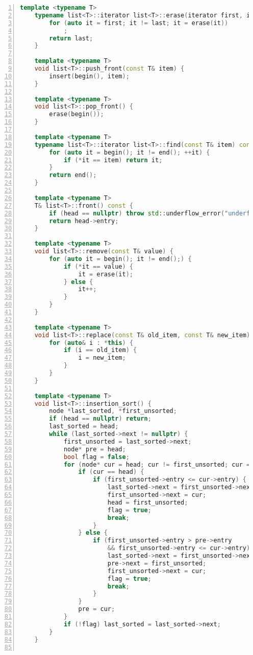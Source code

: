 \documentclass{article}
\begin{document}
\begin{lstlisting}[xleftmargin = 2em,xrightmargin = 2em, aboveskip = 0.5em, numbers = left, language = C++]
    template <typename T>
    typename list<T>::iterator list<T>::erase(iterator first, iterator last) {
        for (auto it = first; it != last; it = erase(it))
            ;
        return last;
    }

    template <typename T>
    void list<T>::push_front(const T& item) {
        insert(begin(), item);
    }

    template <typename T>
    void list<T>::pop_front() {
        erase(begin());
    }

    template <typename T>
    typename list<T>::iterator list<T>::find(const T& item) const {
        for (auto it = begin(); it != end(); ++it) {
            if (*it == item) return it;
        }
        return end();
    }

    template <typename T>
    T& list<T>::front() const {
        if (head == nullptr) throw std::underflow_error("underflow");
        return head->entry;
    }

    template <typename T>
    void list<T>::remove(const T& value) {
        for (auto it = begin(); it != end();) {
            if (*it == value) {
                it = erase(it);
            } else {
                it++;
            }
        }
    }

    template <typename T>
    void list<T>::replace(const T& old_item, const T& new_item) {
        for (auto& i : *this) {
            if (i == old_item) {
                i = new_item;
            }
        }
    }

    template <typename T>
    void list<T>::insertion_sort() {
        node *last_sorted, *first_unsorted;
        if (head == nullptr) return;
        last_sorted = head;
        while (last_sorted->next != nullptr) {
            first_unsorted = last_sorted->next;
            node* pre = head;
            bool flag = false;
            for (node* cur = head; cur != first_unsorted; cur = cur->next) {
                if (cur == head) {
                    if (first_unsorted->entry <= cur->entry) {
                        last_sorted->next = first_unsorted->next;
                        first_unsorted->next = cur;
                        head = first_unsorted;
                        flag = true;
                        break;
                    }
                } else {
                    if (first_unsorted->entry > pre->entry
                        && first_unsorted->entry <= cur->entry) {
                        last_sorted->next = first_unsorted->next;
                        pre->next = first_unsorted;
                        first_unsorted->next = cur;
                        flag = true;
                        break;
                    }
                }
                pre = cur;
            }
            if (!flag) last_sorted = last_sorted->next;
        }
    }


\end{lstlisting}
\end{document}
